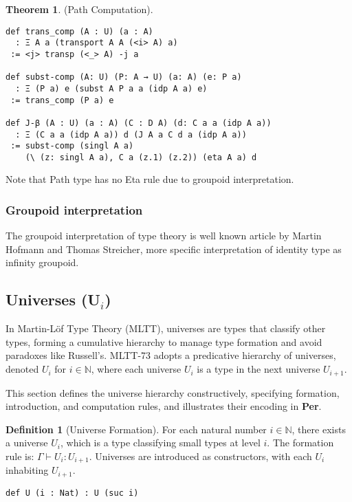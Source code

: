 \documentclass{article}
\theoremstyle{definition}
\newtheorem{definition}{Definition}
\newtheorem{theorem}{Theorem}
\begin{document}
\begin{theorem} (Path Computation).
\begin{lstlisting}
def trans_comp (A : U) (a : A)
  : Ξ A a (transport A A (<i> A) a)
 := <j> transp (<_> A) -j a

def subst-comp (A: U) (P: A → U) (a: A) (e: P a)
  : Ξ (P a) e (subst A P a a (idp A a) e)
 := trans_comp (P a) e

def J-β (A : U) (a : A) (C : D A) (d: C a a (idp A a))
  : Ξ (C a a (idp A a)) d (J A a C d a (idp A a))
 := subst-comp (singl A a)
    (\ (z: singl A a), C a (z.1) (z.2)) (eta A a) d
\end{lstlisting}
\end{theorem}

Note that Path type has no Eta rule due to groupoid interpretation.

\subsubsection*{Groupoid interpretation}
The groupoid interpretation of type theory is well known article by Martin Hofmann and Thomas Streicher,
more specific interpretation of identity type as infinity groupoid.


\subsection{Universes (U$_i$)}
In Martin-Löf Type Theory (MLTT), universes are types that classify other types,
forming a cumulative hierarchy to manage type formation and avoid paradoxes like
Russell’s. MLTT-73 adopts a predicative hierarchy
of universes, denoted \( U_i \) for \( i \in \mathbb{N} \), where each
universe \( U_i \) is a type in the next universe \( U_{i+1} \).

This section defines the universe hierarchy constructively,
specifying formation, introduction, and computation rules,
and illustrates their encoding in \textbf{Per}.

\begin{definition}[Universe Formation]
For each natural number \( i \in \mathbb{N} \), there exists a universe \( U_i \), which is a type classifying small types at level \( i \). The formation rule is:
$\Gamma \vdash U_i : U_{i+1}$.
Universes are introduced as constructors, with each \( U_i \) inhabiting \( U_{i+1} \).
\begin{lstlisting}[mathescape=true]
def U (i : Nat) : U (suc i)
\end{lstlisting}
\end{definition}
\end{document}
